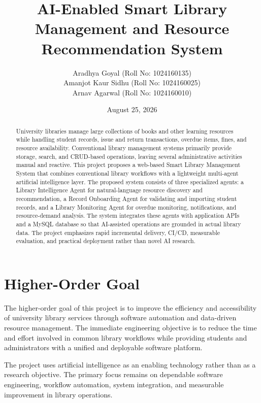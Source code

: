 \documentclass[11pt]{article}
\title{\textbf{AI-Enabled Smart Library Management and Resource Recommendation System}}
\author{Aradhya Goyal (Roll No: 1024160135) \\ Amanjot Kaur Sidhu (Roll No: 1024160025) \\ Arnav Agarwal (Roll No: 1024160010)}
\date{August 25, 2026}
\begin{document}
\maketitle

\begin{abstract}
University libraries manage large collections of books and other learning resources while handling student records, issue and return transactions, overdue items, fines, and resource availability. Conventional library management systems primarily provide storage, search, and CRUD-based operations, leaving several administrative activities manual and reactive. This project proposes a web-based Smart Library Management System that combines conventional library workflows with a lightweight multi-agent artificial intelligence layer. The proposed system consists of three specialized agents: a Library Intelligence Agent for natural-language resource discovery and recommendation, a Record Onboarding Agent for validating and importing student records, and a Library Monitoring Agent for overdue monitoring, notifications, and resource-demand analysis. The system integrates these agents with application APIs and a MySQL database so that AI-assisted operations are grounded in actual library data. The project emphasizes rapid incremental delivery, CI/CD, measurable evaluation, and practical deployment rather than novel AI research.
\end{abstract}

\section{Higher-Order Goal}
The higher-order goal of this project is to improve the efficiency and accessibility of university library services through software automation and data-driven resource management. The immediate engineering objective is to reduce the time and effort involved in common library workflows while providing students and administrators with a unified and deployable software platform.

The project uses artificial intelligence as an enabling technology rather than as a research objective. The primary focus remains on dependable software engineering, workflow automation, system integration, and measurable improvement in library operations.
\end{document}

